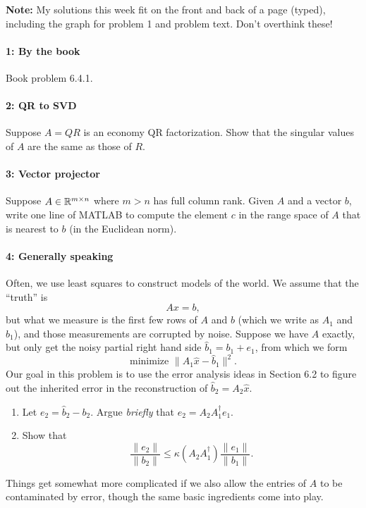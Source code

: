 \documentclass[12pt, leqno]{article}
\begin{document}

{\bf Note:} My solutions this week fit on the front and back of a page
(typed), including the graph for problem 1 and problem text.  Don't
overthink these!

\paragraph*{1: By the book}
Book problem 6.4.1.

\paragraph*{2: QR to SVD}
Suppose $A = QR$ is an economy QR factorization.  Show that the
singular values of $A$ are the same as those of $R$.

\paragraph*{3: Vector projector}
Suppose $A \in \mathbb{R}^{m \times n}$ where $m > n$ has full column rank.
Given $A$ and a vector $b$, write one line of MATLAB to compute the
element $c$ in the range space of $A$ that is nearest to $b$
(in the Euclidean norm).

\paragraph*{4: Generally speaking}
Often, we use least squares to construct models of the world.  We
assume that the ``truth'' is
\[
  Ax = b,
\]
but what we measure is the first few rows of $A$ and $b$ (which we
write as $A_1$ and $b_1$), and those measurements are corrupted by
noise.  Suppose we have $A$ exactly, but only get the noisy
partial right hand side $\hat{b}_1 = b_1+e_1$, from which we form
\[
  \mbox{minimize } \|A_1 \hat{x} - \hat{b}_1\|^2.
\]
Our goal in this problem is to use the error analysis ideas in
Section 6.2 to figure out the inherited error in the reconstruction
of $\hat{b}_2 = A_2 \hat{x}$.
\begin{enumerate}
\item
  Let $e_2 = \hat{b}_2-b_2$.  Argue {\em briefly} that
  $e_2 = A_2 A_1^\dagger e_1$.
\item
  Show that
  \[
    \frac{\|e_2\|}{\|b_2\|} \leq \kappa(A_2 A_1^\dagger) \frac{\|e_1\|}{\|b_1\|}.
  \]
\end{enumerate}
Things get somewhat more complicated if we also allow the entries of
$A$ to be contaminated by error, though the same basic ingredients
come into play.
\end{document}
